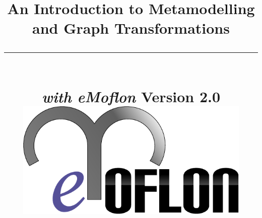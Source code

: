 \title{
\flushright
{\LARGE\bfseries An Introduction to Metamodelling\\
and Graph Transformations}
\noindent\rule[-1ex]{\textwidth}{5pt}\\[2.5ex]
\hfill\emph{\LARGE\bfseries with eMoflon}
\flushleft
{\small Version 2.0}
\flushright
\includegraphics[width=0.85\textwidth]{pics/eMoflon3} 
}

\date{}  
\author{} 